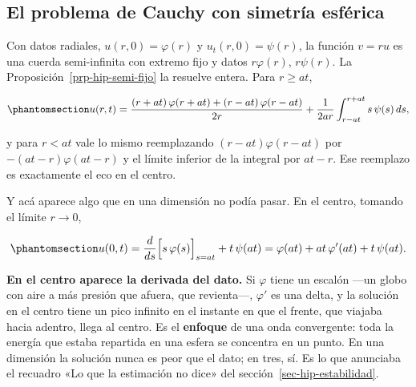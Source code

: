 \documentclass[
  spanish,
  a4paper,
]{scrbook}
\theoremstyle{definition}
\theoremstyle{plain}
\theoremstyle{definition}
\theoremstyle{plain}
\theoremstyle{definition}
\theoremstyle{remark}
\begin{document}
\subsection{El problema de Cauchy con simetría
esférica}\label{sec-hip-cauchy-esferico}

Con datos radiales, \(u(r,0) = \varphi(r)\) y \(u_t(r,0) = \psi(r)\), la
función \(v = ru\) es una cuerda semi-infinita con extremo fijo y datos
\(r\varphi(r)\), \(r\psi(r)\). La Proposición~\ref{prp-hip-semi-fijo} la
resuelve entera. Para \(r\ge at\),

\begin{equation}\protect\phantomsection\label{eq-hip-cauchy-esferico}{
u(r,t) = \frac{(r+at)\,\varphi(r+at) + (r-at)\,\varphi(r-at)}{2r} + \frac{1}{2ar}\int_{r-at}^{r+at}s\,\psi(s)\,ds ,
}\end{equation}

y para \(r<at\) vale lo mismo reemplazando \((r-at)\varphi(r-at)\) por
\(-(at-r)\varphi(at-r)\) y el límite inferior de la integral por
\(at-r\). Ese reemplazo es exactamente el eco en el centro.

Y acá aparece algo que en una dimensión no podía pasar. En el centro,
tomando el límite \(r\to0\),

\begin{equation}\protect\phantomsection\label{eq-hip-centro}{
u(0,t) = \frac{d}{ds}\Big[s\,\varphi(s)\Big]_{s=at} + t\,\psi(at) = \varphi(at) + at\,\varphi'(at) + t\,\psi(at) .
}\end{equation}

\textbf{En el centro aparece la derivada del dato.} Si \(\varphi\) tiene
un escalón ---un globo con aire a más presión que afuera, que
revienta---, \(\varphi'\) es una delta, y la solución en el centro tiene
un pico infinito en el instante en que el frente, que viajaba hacia
adentro, llega al centro. Es el \textbf{enfoque} de una onda
convergente: toda la energía que estaba repartida en una esfera se
concentra en un punto. En una dimensión la solución nunca es peor que el
dato; en tres, sí. Es lo que anunciaba el recuadro «Lo que la estimación
no dice» del sección~\ref{sec-hip-estabilidad}.
\end{document}
